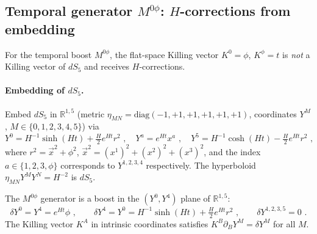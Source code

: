 \documentclass[11pt]{article}
\begin{document}
\subsection{\texorpdfstring{Temporal generator $M^{0\phi}$: $H$-corrections from embedding}{Temporal generator M\^{}0phi: H-corrections from embedding}}
\label{subsec:temporal-boost}

For the temporal boost $M^{0\phi}$, the flat-space Killing vector $K^0 = \phi$, $K^\phi = t$
is \emph{not} a Killing vector of $dS_5$ and receives $H$-corrections.

\paragraph{Embedding of $dS_5$.}
Embed $dS_5$ in $\mathbb{R}^{1,5}$ (metric $\eta_{MN} = \mathrm{diag}(-1,+1,+1,+1,+1,+1)$,
coordinates $Y^M$, $M \in \{0,1,2,3,4,5\}$) via
\begin{equation}
\label{eq:6d-embedding}
Y^0 = H^{-1}\sinh(Ht) + \tfrac{H}{2}e^{Ht}r^2 \,\,, \quad
Y^a = e^{Ht}x^a \,\,, \quad
Y^5 = H^{-1}\cosh(Ht) - \tfrac{H}{2}e^{Ht}r^2 \,\,,
\end{equation}
where $r^2 = \vec{x}^2 + \phi^2$, $\vec{x}^2 = (x^1)^2 + (x^2)^2 + (x^3)^2$, and the index
$a \in \{1,2,3,\phi\}$ corresponds to $Y^{1,2,3,4}$ respectively.  The hyperboloid
$\eta_{MN}Y^MY^N = H^{-2}$ is $dS_5$.

The $M^{0\phi}$ generator is a boost in the $(Y^0, Y^4)$ plane of $\mathbb{R}^{1,5}$:
\begin{equation}
\label{eq:boost-action}
\delta Y^0 = Y^4 = e^{Ht}\phi \,\,, \qquad
\delta Y^4 = Y^0 = H^{-1}\sinh(Ht) + \tfrac{H}{2}e^{Ht}r^2 \,\,, \qquad
\delta Y^{1,2,3,5} = 0 \,\,.
\end{equation}
The Killing vector $K^A$ in intrinsic coordinates satisfies $K^B\partial_B Y^M = \delta Y^M$ for all $M$.
\end{document}
